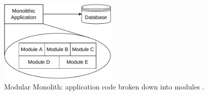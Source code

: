 \begin{figure}[!htbp]
    \centering
    \includegraphics[width=0.50\textwidth]{img/diagrams/pdf/modular-monolith.drawio.pdf}
    \caption[Modular Monolith]{Modular Monolith: application code broken down into modules \parencite{newman2019monolith}.}
    \label{fig:modular-monolith}
\end{figure}

